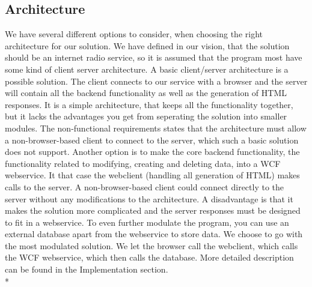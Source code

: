 \documentclass[a4paper,11pt,report]{article}
\begin{document}
{\subsection{Architecture}
We have several different options to consider, when choosing the right architecture for our solution. We have defined in our vision, that the solution should be an internet radio service, so it is assumed that the program most have some kind of client server architecture. A basic client/server architecture is a possible solution. The client connects to our service with a browser and the server will contain all the backend functionality as well as the generation of HTML responses. It is a simple architecture, that keeps all the functionality together, but it lacks the advantages you get from seperating the solution into smaller modules. The non-functional requirements states that the architecture must allow a non-browser-based client to connect to the server, which such a basic solution does not support. Another option is to make the core backend functionality, the functionality related to modifying, creating and deleting data, into a WCF webservice. It that case the webclient (handling all generation of HTML) makes calls to the server. A non-browser-based client could connect directly to the server without any modifications to the architecture. A disadvantage is that it makes the solution more complicated and the server responses must be designed to fit in a webservice. To even further modulate the program, you can use an external database apart from the webservice to store data. We choose to go with the most modulated solution. We let the browser call the webclient, which calls the WCF webservice, which then calls the database. More detailed description can be found in the Implementation section. \\*

}
\end{document}
